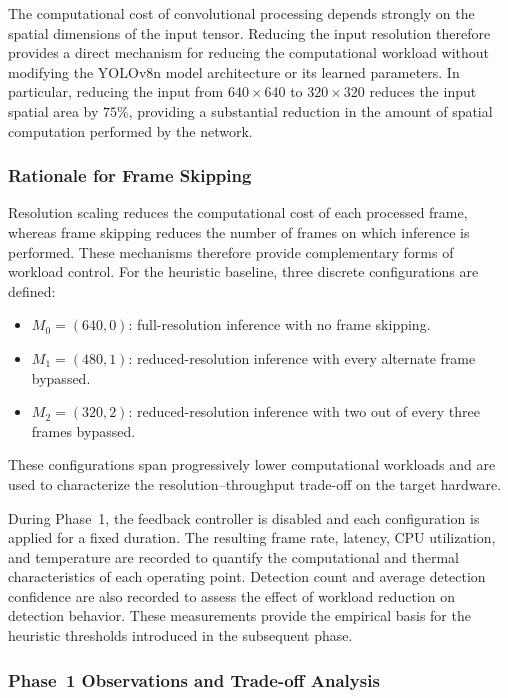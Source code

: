 \documentclass{ieeeaccess}
\begin{document}
The computational cost of convolutional processing depends strongly on the
spatial dimensions of the input tensor. Reducing the input resolution
therefore provides a direct mechanism for reducing the computational workload
without modifying the YOLOv8n model architecture or its learned parameters.
In particular, reducing the input from $640 \times 640$ to
$320 \times 320$ reduces the input spatial area by $75\%$, providing a
substantial reduction in the amount of spatial computation performed by the
network.

\subsubsection*{Rationale for Frame Skipping}

Resolution scaling reduces the computational cost of each processed frame,
whereas frame skipping reduces the number of frames on which inference is
performed. These mechanisms therefore provide complementary forms of
workload control. For the heuristic baseline, three discrete configurations
are defined:

\begin{itemize}
    \item $M_0=(640,0)$: full-resolution inference with no frame skipping.
    
    \item $M_1=(480,1)$: reduced-resolution inference with every alternate
    frame bypassed.
    
    \item $M_2=(320,2)$: reduced-resolution inference with two out of every
    three frames bypassed.
\end{itemize}

These configurations span progressively lower computational workloads and are
used to characterize the resolution--throughput trade-off on the target
hardware.

During Phase~1, the feedback controller is disabled and each configuration is
applied for a fixed duration. The resulting frame rate, latency, CPU
utilization, and temperature are recorded to quantify the computational and
thermal characteristics of each operating point. Detection count and average
detection confidence are also recorded to assess the effect of workload
reduction on detection behavior. These measurements provide the empirical
basis for the heuristic thresholds introduced in the subsequent phase.

\subsubsection*{Phase~1 Observations and Trade-off Analysis}
\end{document}
